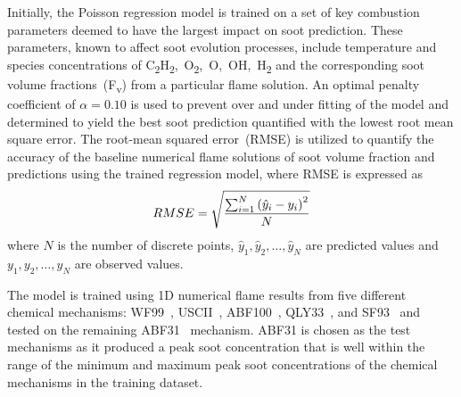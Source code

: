 \documentclass[12pt]{CHT-20}
\begin{document}
Initially, the Poisson regression model is trained on a set of key combustion parameters deemed to have the largest impact on soot prediction. These parameters, known to affect soot evolution processes, include temperature and species concentrations of C\textsubscript{2}H\textsubscript{2},~O\textsubscript{2},~O,~OH,~H\textsubscript{2} and the corresponding soot volume fractions~(F\textsubscript{v}) from a particular flame solution. An optimal penalty coefficient of $\alpha=0.10$ is used to prevent over and under fitting of the model and determined to yield the best soot prediction quantified with the lowest root mean square error. The root-mean squared error~(RMSE) is utilized to quantify the accuracy of the baseline numerical flame solutions of soot volume fraction and predictions using the trained regression model, where RMSE is expressed as
\begin{equation}
    RMSE = \sqrt{\frac{\sum_{i=1}^N \left(\hat{y}_i-y_i\right)^2}{N}} \\ 
    \label{eq:RMSE}
\end{equation}
where $N$ is the number of discrete points, $\hat{y}_1,\hat{y}_2,\dots,\hat{y}_N$ are predicted values and $y_1,y_2,\dots, y_N$ are observed values.

The model is trained using 1D numerical flame results from five different chemical mechanisms: WF99~\citep[]{Wang1997}, USCII~\citep[]{Wang2007_USCII_mech}, ABF100~\citep[]{Appel2000}, QLY33~\citep[]{Mehta2009}, and SF93~\citep[]{Slavinskaya2009} and tested on the remaining ABF31~\citep[]{Mehta2009} mechanism. ABF31 is chosen as the test mechanisms as it produced a peak soot concentration that is well within the range of the minimum and maximum peak soot concentrations of the chemical mechanisms in the training dataset. 
\end{document}
